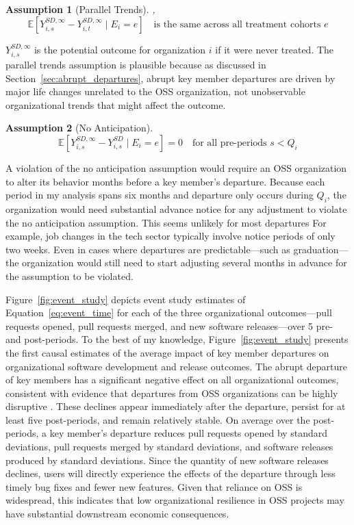 \documentclass[12pt,notitlepage]{article}
\newcommand{\E}{\mathbb{E}}
\newtheorem{assumption}{Assumption}
\begin{document}
\begin{assumption}[Parallel Trends]\label{ass:parallel_trends}
, 
\[
\E[Y_{i,s}^{SD,\infty} - Y_{i,t}^{SD, \infty}\mid E_i = e] 
\quad \text{is the same across all treatment cohorts $e$}
\]
\end{assumption}
$Y_{i,s}^{SD,\infty}$ is the potential outcome for organization $i$ if it were never treated. 
The parallel trends assumption is plausible because as discussed in Section~\ref{sec:abrupt_departures}, abrupt key member departures are driven by major life changes unrelated to the OSS organization, not unobservable organizational trends that might affect the outcome.

\begin{assumption}[No Anticipation]\label{ass:no_ant}
\[
\E[Y_{i,s}^{SD,\infty} - Y_{i,s}^{SD}\mid E_i = e]  = 0
\quad \text{for all pre-periods $s < Q_i$}
\]
\end{assumption}
A violation of the no anticipation assumption would require an OSS organization to alter its behavior months before a key member’s departure. 
Because each period in my analysis spans six months and departure only occurs during $Q_i$, the organization would need substantial advance notice for any adjustment to violate the no anticipation assumption.
This seems unlikely for most departures
For example, job changes in the tech sector typically involve notice periods of only two weeks.
Even in cases where departures are predictable—such as graduation—the organization would still need to start adjusting several months in advance for the assumption to be violated.


Figure~\ref{fig:event_study} depicts event study estimates of Equation~\ref{eq:event_time} for each of the three organizational outcomes---pull requests opened, pull requests merged, and new software releases---over 5 pre- and post-periods. 
To the best of my knowledge, Figure~\ref{fig:event_study} presents the first causal estimates of the average impact of key member departures on organizational software development and release outcomes. 
The abrupt departure of key members has a significant negative effect on all organizational outcomes, consistent with evidence that departures from OSS organizations can be highly disruptive \citep{rashid_systematic_2019}.
These declines appear immediately after the departure, persist for at least five post-periods, and remain relatively stable. 
On average over the \NumPostPeriod{} post-periods, a key member’s departure reduces pull requests opened by \AvgPRsOpenedDecline{} standard deviations, pull requests merged by \AvgPRsMergedDecline{} standard deviations, and software releases produced by \AvgReleasesDecline{} standard deviations.
Since the quantity of new software releases declines, users will directly experience the effects of the departure through less timely bug fixes and fewer new features.
Given that reliance on OSS is widespread, this indicates that low organizational resilience in OSS projects may have substantial downstream economic consequences.
\end{document}
